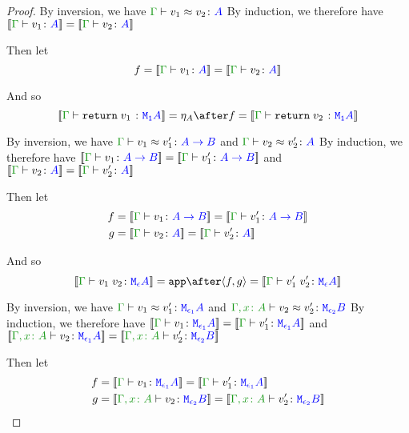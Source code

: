 \documentclass{report}
\begin{document}
\begin{framed}
\begin{proof}
        
        \case{\eqreturn}
        By inversion, we have $\gberelation{v_1}{v_2}{A}$
        By induction, we therefore have $\deno{\gtyperelation{v_1}{A}} = \deno{\gtyperelation{v_2}{A}}$
        
        Then let
        \begin{equation}
            f = \deno{\gtyperelation{v_1}{A}} = \deno{\gtyperelation{v_2}{A}}
        \end{equation}
        
        And so
        \begin{equation}
            \deno{\gtyperelation{\return{v_1}}{\M{\1}{A}}} = \point{A}\after f = \deno{\gtyperelation{\return{v_2}}{\M{\1}{A}}}
        \end{equation}
        
        
        \case{\eqapply}
        By inversion, we have $\gberelation{v_1}{v_1'}{\ab}$ and $\gberelation{v_2}{v_2'}{A}$
        By induction, we therefore have $\deno{\gtyperelation{v_1}{\ab}}= \deno{\gtyperelation{v_1'}{\ab}}$ and $\deno{\gtyperelation{v_2}{A}} = \deno{\gtyperelation{v_2'}{A}}$
        
        Then let
        \begin{align*}
            f &{}= \deno{\gtyperelation{v_1}{\ab}} = \deno{\gtyperelation{v_1'}{\ab}}\\
            g &{}= \deno{\gtyperelation{v_2}{A}} = \deno{\gtyperelation{v_2'}{A}}
        \end{align*}
        
        
        
        And so
        \begin{equation}
            \deno{\gtyperelation{\apply{v_1}{v_2}}{\M{\e}{A}}} = \app\after\pr{f}{g} = \deno{\gtyperelation{\apply{v_1'}{v_2'}}{\M{\e}{A}}}
        \end{equation}
        
        
        \case{\eqbind}
        By inversion, we have $\gberelation{v_1}{v_1'}{\M{\e_1}{A}}$ and $\berelation{\gax}{v_2}{v_2'}{\M{\e_2}{B}}$
        By induction, we therefore have $\deno{\gtyperelation{v_1}{\M{\e_1}{A}}}= \deno{\gtyperelation{v_1'}{\M{\e_1}{A}}}$ and $\deno{\typerelation{\gax}{v_2}{\M{\e_1}{A}}} = \deno{\typerelation{\gax}{v_2'}{\M{\e_2}{B}}}$
        
        Then let
        \begin{align*}
            f &{}=\deno{\gtyperelation{v_1}{\M{\e_1}{A}}}= \deno{\gtyperelation{v_1'}{\M{\e_1}{A}}}\\
            g &{}=\deno{\typerelation{\gax}{v_2}{\M{\e_2}{B}}} = \deno{\typerelation{\gax}{v_2'}{\M{\e_2}{B}}}
        \end{align*}
        

\end{proof}
\end{framed}
\end{document}
